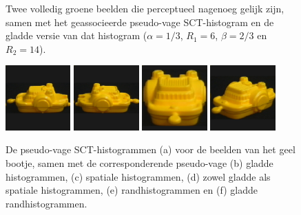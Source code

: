 \begin{figure}[bp]
\caption{\label{fig:histogrammen_smoothed_sct}Twee volledig groene beelden die perceptueel 
nagenoeg gelijk zijn, samen met het geassocieerde pseudo-vage SCT-histogram en de gladde 
versie van dat histogram ($\alpha=1/3$, $R_1=6$, $\beta=2/3$ en $R_2=14$).}
\vspace{5pt}
\centering
{}
\end{figure}

\begin{figure}[bp]
\caption{\label{fig:uitgebreide_sct-histogrammen}De pseudo-vage SCT-histogrammen (a) voor de 
beelden van het geel bootje, samen met de corresponderende pseudo-vage (b) gladde histogrammen, 
(c) spatiale histogrammen, (d) zowel gladde als
spatiale histogrammen, (e) randhistogrammen en (f) gladde randhistogrammen.}
\vspace{5pt}
\centering
\includegraphics[width=2.5cm]{coil/beeld-12.eps}
\includegraphics[width=2.5cm]{coil/beeld-13.eps}
\includegraphics[width=2.5cm]{coil/beeld-14.eps}
\includegraphics[width=2.5cm]{coil/beeld-15.eps}

\end{figure}
